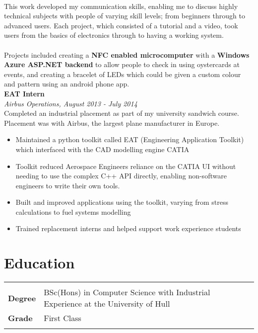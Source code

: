 \documentclass{article}
\begin{document}
\begin{flushleft}
\paragraph{}This work developed my communication skills, enabling me to discuss highly technical subjects with people of varying skill levels; from beginners through to advanced users. Each project, which consisted of a tutorial and a video, took users from the basics of electronics through to having a working system.

\paragraph{}Projects included creating a \textbf{NFC enabled microcomputer} with a \textbf{Windows Azure ASP.NET backend} to allow people to check in using oystercards at events, and creating a bracelet of LEDs which could be given a custom colour and pattern using an android phone app. \\[10pt]

\textbf{EAT Intern}\\
\textit{Airbus Operations, August 2013 - July 2014}\\[5pt]
Completed an industrial placement as part of my university sandwich course. Placement was with Airbus, the largest plane manufacturer in Europe. 

\begin{itemize}
\item Maintained a python toolkit called EAT (Engineering Application Toolkit) which interfaced with the CAD modelling engine CATIA
\item Toolkit reduced Aerospace Engineers reliance on the CATIA UI without needing to use the complex C++ API directly, enabling non-software engineers to write their own tools.
\item Built and improved applications using the toolkit, varying from stress calculations to fuel systems modelling	
\item Trained replacement interns and helped support work experience students
\end{itemize}

\section*{Education}
\begin{tabular}{@{}ll@{}}
    \multicolumn{2}{l}{}\\
    \textbf{Degree} &BSc(Hons) in Computer Science with Industrial Experience at the University of Hull  \\
    \textbf{Grade} &First Class   \\
    &\\
\end{tabular}


\end{flushleft}
\end{document}
